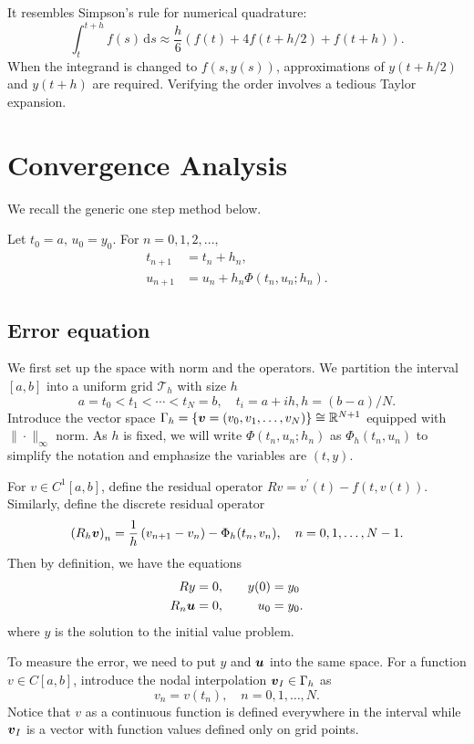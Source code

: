 \documentclass[10pt]{amsart}
\begin{document}
It resembles Simpson's rule for numerical quadrature:  
\[
\int_{t}^{t+h} f(s)\,\mathrm{d}s \approx \frac{h}{6} \left(f(t) + 4f(t+h/2) + f(t+h)\right).  
\]  
When the integrand is changed to $f(s, y(s))$, approximations of $y(t+h/2)$ and $y(t+h)$ are required. Verifying the order involves a tedious Taylor expansion.  

\section{Convergence Analysis}
We recall the generic one step method below.
\medskip
\begin{tcolorbox}[colframe=black!15!white, coltitle=white!5!black, title = \bf One Step Method ($\Phi$)]
Let $t_0=a,\, u_0 = y_0$. For $n=0,1,2,...,$
\begin{align*}
t_{n+1} &= t_n + h_n,\\
u_{n+1} &= u_n + h_n \Phi(t_n, u_n; h_n).
\end{align*}
\end{tcolorbox}


\subsection{Error equation}
We first set up the space with norm and the operators. We partition the interval $[a,b]$ into a uniform grid $\mathcal T_h$ with size $h$
$$
a = t_0 < t_1 < \cdots < t_{N} = b, \quad t_i = a + ih, h = (b-a)/N.
$$
Introduce the vector space $\Gamma_h = \{ \boldsymbol v = (v_0, v_1, \ldots, v_{N})\}\cong \mathbb R^{N+1}$ equipped with $\|\cdot\|_{\infty}$ norm. As $h$ is fixed, we will write $\Phi(t_n, u_n; h_n)$ as $\Phi_h(t_n, u_n)$ to simplify the notation and emphasize the variables are $(t, y)$.

For $v\in C^1[a,b]$, define the residual operator $R v=v^{\prime}(t)-f(t, v(t))$. Similarly, define the discrete residual operator
$$
\left(R_h \boldsymbol v\right)_n =\frac{1}{h}\left(v_{n+1}-v_n\right)-\Phi_h(t_n, v_n), \quad n =0,1,\ldots, N-1.
$$
Then by definition, we have the equations$$
\begin{aligned}
R y & =0, \quad &y(0) &= y_0 \\
R_n \boldsymbol u & =0, \quad &u_0 &= y_0.
\end{aligned}
$$
where $y$ is the solution to the initial value problem. 

To measure the error, we need to put $y$ and $\boldsymbol u$ into the same space. For a function $v\in C[a,b]$, introduce the nodal interpolation $\boldsymbol v_I \in \Gamma_h$ as
$$
v_n = v(t_n), \quad n = 0, 1, \ldots, N.
$$
Notice that $v$ as a continuous function is defined everywhere in the interval while $\boldsymbol v_I$ is a vector with function values defined only on grid points. 
\end{document}
